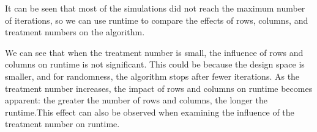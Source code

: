 \documentclass[
  a4paper,
  oneside,
  openany,
  12pt,
  onecolumn]{book}
\theoremstyle{plain}
\theoremstyle{definition}
\theoremstyle{remark}
\begin{document}
It can be seen that most of the simulations did not reach the maximum
number of iterations, so we can use runtime to compare the effects of
rows, columns, and treatment numbers on the algorithm.

\begin{figure}


\caption{\label{fig-align}}

\end{figure}%

We can see that when the treatment number is small, the influence of
rows and columns on runtime is not significant. This could be because
the design space is smaller, and for randomness, the algorithm stops
after fewer iterations. As the treatment number increases, the impact of
rows and columns on runtime becomes apparent: the greater the number of
rows and columns, the longer the runtime.This effect can also be
observed when examining the influence of the treatment number on
runtime.
\end{document}
